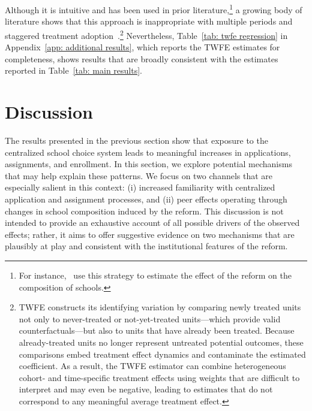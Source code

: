 \documentclass[11pt]{article}
\begin{document}
Although it is intuitive and has been used in prior literature,\footnote{For instance,~\cite{urzua2023} use this strategy to estimate the effect of the reform on the composition of schools.} a growing body of literature shows that this approach is inappropriate with multiple periods and staggered treatment adoption~\citep{borusyak2018, dechaisemartin2020, goodmanbacon2021, sun2021}.\footnote{TWFE constructs its identifying variation by comparing newly treated units not only to never-treated or not-yet-treated units—which provide valid counterfactuals—but also to units that have already been treated. Because already-treated units no longer represent untreated potential outcomes, these comparisons embed treatment effect dynamics and contaminate the estimated coefficient. As a result, the TWFE estimator can combine heterogeneous cohort- and time-specific treatment effects using weights that are difficult to interpret and may even be negative, leading to estimates that do not correspond to any meaningful average treatment effect.} Nevertheless, Table~\ref{tab: twfe regression} in Appendix~\ref{app: additional results}, which reports the TWFE estimates for completeness, shows results that are broadly consistent with the estimates reported in Table~\ref{tab: main results}.

\section{Discussion}\label{sec: discussion}

The results presented in the previous section show that exposure to the centralized school choice system leads to meaningful increases in  applications, assignments, and enrollment. In this section, we explore potential mechanisms that may help explain these patterns. We focus on two channels that are especially salient in this context: (i) increased familiarity with centralized application and assignment processes, and (ii) peer effects operating through changes in school composition induced by the reform. This discussion is not intended to provide an exhaustive account of all possible drivers of the observed effects; rather, it aims to offer suggestive evidence on two mechanisms that are plausibly at play and consistent with the institutional features of the reform.
\end{document}
